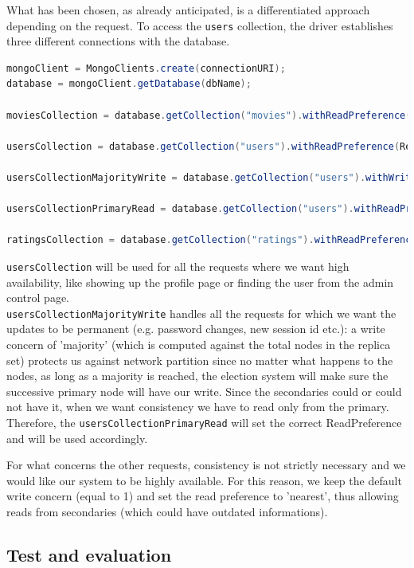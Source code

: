 \documentclass[11pt]{article}
\begin{document}
What has been chosen, as already anticipated, is a differentiated approach depending on the request. To access the \lstinline{users} collection, the driver establishes three different connections with the database.

\begin{lstlisting}[language=java]
mongoClient = MongoClients.create(connectionURI);
database = mongoClient.getDatabase(dbName);

moviesCollection = database.getCollection("movies").withReadPreference(ReadPreference.nearest());

usersCollection = database.getCollection("users").withReadPreference(ReadPreference.nearest());

usersCollectionMajorityWrite = database.getCollection("users").withWriteConcern(WriteConcern.MAJORITY);

usersCollectionPrimaryRead = database.getCollection("users").withReadPreference(ReadPreference.primary());

ratingsCollection = database.getCollection("ratings").withReadPreference(ReadPreference.nearest());
\end{lstlisting}

\lstinline{usersCollection} will be used for all the requests where we want high availability, like showing up the profile page or finding the user from the admin control page.
\\
\lstinline{usersCollectionMajorityWrite} handles all the requests for which we want the updates to be permanent (e.g. password changes, new session id etc.): a write concern of 'majority' (which is computed against the total nodes in the replica set) protects us against network partition since no matter what happens to the nodes, as long as a majority is reached, the election system will make sure the successive primary node will have our write. Since the secondaries could or could not have it, when we want consistency we have to read only from the primary. Therefore, the \lstinline{usersCollectionPrimaryRead} will set the correct ReadPreference and will be used accordingly.

For what concerns the other requests, consistency is not strictly necessary and we would like our system to be highly available. For this reason, we keep the default write concern (equal to 1) and set the read preference to 'nearest', thus allowing reads from secondaries (which could have outdated informations).
\subsection{Test and evaluation}
\end{document}
